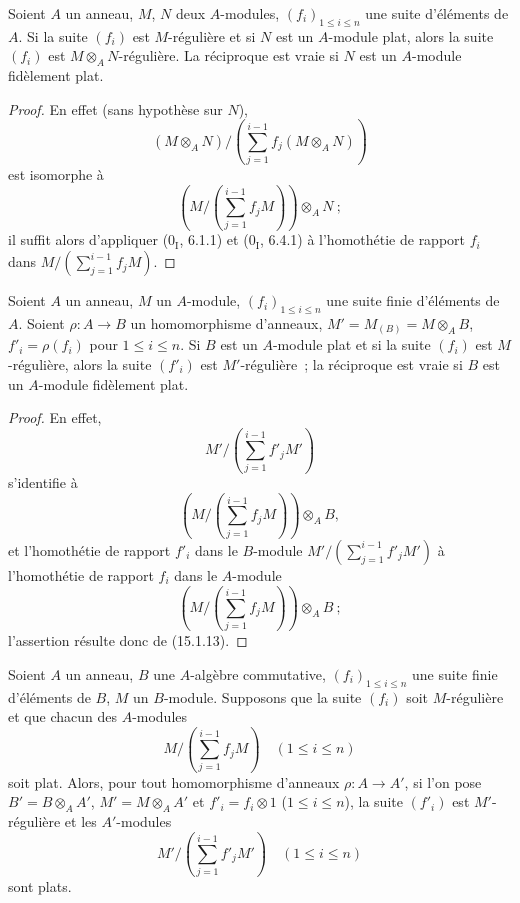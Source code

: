 \begin{proposition}[15.1.13]
\label{0.15.1.13-fr}
Soient $A$ un anneau, $M$, $N$ deux $A$-modules, $(f_i)_{1\leq i\leq n}$ une
suite d'éléments de $A$. Si la suite $(f_i)$ est $M$-régulière et si $N$ est
un $A$-module plat, alors la suite $(f_i)$ est
$M\otimes_A N$-régulière. La réciproque est vraie si $N$ est un $A$-module
fidèlement plat.
\end{proposition}

\begin{proof}
En effet (sans hypothèse sur $N$),
\[
  (M\otimes_A N)/
  \left(\sum_{j=1}^{i-1}f_j(M\otimes_A N)\right)
\]
est isomorphe à
\[
  \left(M/\left(\sum_{j=1}^{i-1}f_jM\right)\right)\otimes_A N~;
\]
il suffit alors d'appliquer ($0_{\mathrm I}$, 6.1.1) et
($0_{\mathrm I}$, 6.4.1) à l'homothétie de rapport $f_i$ dans
$M/(\sum_{j=1}^{i-1}f_jM)$.
\end{proof}

\begin{corollary}[15.1.14]
\label{0.15.1.14-fr}
Soient $A$ un anneau, $M$ un $A$-module, $(f_i)_{1\leq i\leq n}$ une suite
finie d'éléments de $A$. Soient $\rho:A\to B$ un homomorphisme d'anneaux,
$M'=M_{(B)}=M\otimes_A B$, $f'_i=\rho(f_i)$ pour $1\leq i\leq n$. Si $B$ est
un $A$-module plat et si la suite $(f_i)$ est $M$-régulière, alors la suite
$(f'_i)$ est $M'$-régulière~; la réciproque est vraie si $B$ est un
$A$-module fidèlement plat.
\end{corollary}

\begin{proof}
En effet,
\[
  M'/\left(\sum_{j=1}^{i-1}f'_jM'\right)
\]
s'identifie à
\[
  \left(M/\left(\sum_{j=1}^{i-1}f_jM\right)\right)\otimes_A B,
\]
et l'homothétie de rapport $f'_i$ dans le $B$-module
$M'/(\sum_{j=1}^{i-1}f'_jM')$ à l'homothétie de rapport $f_i$ dans le
$A$-module
\[
  \left(M/\left(\sum_{j=1}^{i-1}f_jM\right)\right)\otimes_A B~;
\]
l'assertion résulte donc de (15.1.13).
\end{proof}

\begin{proposition}[15.1.15]
\label{0.15.1.15-fr}
Soient $A$ un anneau, $B$ une $A$-algèbre commutative,
$(f_i)_{1\leq i\leq n}$ une suite finie d'éléments de $B$, $M$ un
$B$-module. Supposons que la suite $(f_i)$ soit $M$-régulière et que chacun
des $A$-modules
\[
  M/\left(\sum_{j=1}^{i-1}f_jM\right)\quad(1\leq i\leq n)
\]
soit plat. Alors, pour tout homomorphisme d'anneaux $\rho:A\to A'$, si l'on
pose $B'=B\otimes_A A'$, $M'=M\otimes_A A'$ et $f'_i=f_i\otimes1$
($1\leq i\leq n$), la suite $(f'_i)$ est $M'$-régulière et les
$A'$-modules
\[
  M'/\left(\sum_{j=1}^{i-1}f'_jM'\right)\quad(1\leq i\leq n)
\]
sont plats.
\end{proposition}


